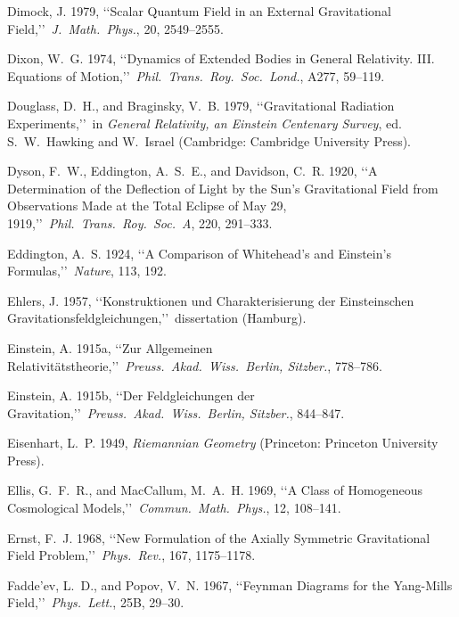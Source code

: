 
\item Dimock, J. 1979, \lq\lq Scalar Quantum Field in an External Gravitational Field,\rq\rq\ \emph{J.\ Math.\ Phys.}, 20, 2549--2555.
\item Dixon, W.~G. 1974, \lq\lq Dynamics of Extended Bodies in General Relativity. III. Equations of Motion,\rq\rq\ \emph{Phil.\ Trans.\ Roy.\ Soc.\ Lond.}, A277, 59--119.
\item Douglass, D.~H., and Braginsky, V.~B. 1979, \lq\lq Gravitational Radiation Experiments,\rq\rq\ in \emph{General Relativity, an Einstein Centenary Survey}, ed. S.~W.~Hawking and W.~Israel (Cambridge: Cambridge University Press).
\item Dyson, F.~W., Eddington, A.~S.~E., and Davidson, C.~R. 1920, \lq\lq A Determination of the Deflection of Light by the Sun's Gravitational Field from Observations Made at the Total Eclipse of May 29, 1919,\rq\rq\ \emph{Phil.\ Trans.\ Roy.\ Soc.\ A}, 220, 291--333.
\item Eddington, A.~S. 1924, \lq\lq A Comparison of Whitehead's and Einstein's Formulas,\rq\rq\ \emph{Nature}, 113, 192.
\item Ehlers, J. 1957, \lq\lq Konstruktionen und Charakterisierung der Einsteinschen Gravitationsfeldgleichungen,\rq\rq\ dissertation (Hamburg).
\item Einstein, A. 1915a, \lq\lq Zur Allgemeinen Relativit{\"a}tstheorie,\rq\rq\ \emph{Preuss.\ Akad.\ Wiss.\ Berlin, Sitzber.}, 778--786.
\item Einstein, A. 1915b, \lq\lq Der Feldgleichungen der Gravitation,\rq\rq\ \emph{Preuss.\ Akad.\ Wiss.\ Berlin, Sitzber.}, 844--847.
\item Eisenhart, L.~P. 1949, \emph{Riemannian Geometry} (Princeton: Princeton University Press).
\item Ellis, G.~F.~R., and MacCallum, M.~A.~H. 1969, \lq\lq A Class of Homogeneous Cosmological Models,\rq\rq\ \emph{Commun.\ Math.\ Phys.}, 12, 108--141.
\item Ernst, F.~J. 1968, \lq\lq New Formulation of the Axially Symmetric Gravitational Field Problem,\rq\rq\ \emph{Phys.\ Rev.}, 167, 1175--1178.
\item Fadde'ev, L.~D., and Popov, V.~N. 1967, \lq\lq Feynman Diagrams for the Yang-Mills Field,\rq\rq\ \emph{Phys.\ Lett.}, 25B, 29--30.
